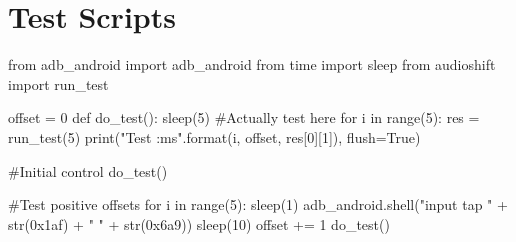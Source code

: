 \chapter{Test Scripts}\label{magicscripts}
\begin{mdframed}
    \begin{python}
from adb_android import adb_android
from time import sleep
from audioshift import run_test

offset = 0
def do_test():
    sleep(5)
    #Actually test here
    for i in range(5):
        res = run_test(5)
        print("Test {} {}:{}ms".format(i, offset, res[0][1]), flush=True)

#Initial control
do_test()

#Test positive offsets
for i in range(5):
    sleep(1)
    adb_android.shell("input tap " + str(0x1af) + " " + str(0x6a9))
    sleep(10)
    offset += 1
    do_test()
    \end{python}
\end{mdframed}
\clearpage

